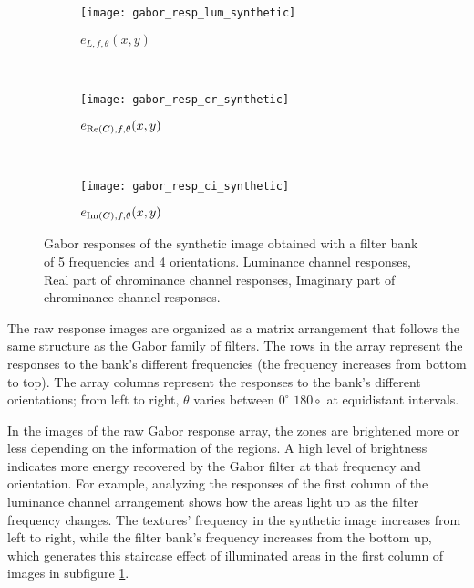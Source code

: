 \begin{figure}[!ht]
    \centering
    \begin{subfigure}[b]{\textwidth}   
        \texttt{[image: gabor\_resp\_lum\_synthetic]}
        \caption{$e_{L, f, \theta}(x,y)$} 
        \label{fig:lum_raw_gabor_energies}
    \end{subfigure} \\ [2ex]   
    \begin{subfigure}[b]{\textwidth}   
    	\texttt{[image: gabor\_resp\_cr\_synthetic]}
    	\caption{$e_{\mathrm{Re}(C), f, \theta}(x,y)$}
        \label{fig:cr_raw_gabor_energies}
    \end{subfigure} \\ [2ex]    	
    \begin{subfigure}[b]{\textwidth}  
        \texttt{[image: gabor\_resp\_ci\_synthetic]}
        \caption{$e_{\mathrm{Im}(C), f, \theta}(x,y)$}
        \label{fig:ci_raw_gabor_energies} 
    \end{subfigure} 
    	    
    \caption{Gabor responses of the synthetic image obtained with a filter bank of 5 frequencies and 4 orientations.  Luminance channel responses,  Real part of chrominance channel responses,  Imaginary part of chrominance channel responses.}\label{fig:synthetic_img_gresponses}    
\end{figure}

The raw response images are organized as a matrix arrangement that follows the same structure as the Gabor family of filters. The rows in the array represent the responses to the bank's different frequencies (the frequency increases from bottom to top). The array columns represent the responses to the bank's different orientations; from left to right, $\theta$ varies between $ 0^\circ $ $180\circ$ at equidistant intervals. 

In the images of the raw Gabor response array, the zones are brightened more or less depending on the information of the regions. A high level of brightness indicates more energy recovered by the Gabor filter at that frequency and orientation. For example, analyzing the responses of the first column of the luminance channel arrangement shows how the areas light up as the filter frequency changes. The textures' frequency in the synthetic image increases from left to right, while the filter bank's frequency increases from the bottom up, which generates this staircase effect of illuminated areas in the first column of images in subfigure \ref{fig:lum_raw_gabor_energies}.

